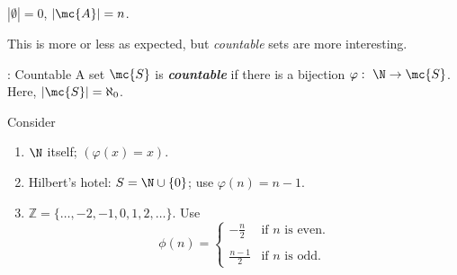 \begin{notation}
	\(|\emptyset|=0\), \(|\mc{A}|=n\).
\end{notation}

This is more or less as expected, but \emph{countable} sets are more interesting.
\begin{ndef}{: Countable}
	A set \(\mc{S}\) is \emph{\textbf{countable}} if there is a bijection \(\varphi:~\N\to \mc{S}\). Here, \(|\mc{S}|=\aleph_0\).
	\begin{example}
		Consider
		\begin{enumerate}
			\item \(\N\) itself; \((\varphi(x)=x)\).
			
			\item Hilbert's hotel: \(S=\N\cup\{0\}\); use \(\varphi(n)=n-1\).
			
			\item \(\mathbb{Z}=\{\dots,-2,-1,0,1,2,\dots\}\). \newline
			Use 
			\begin{equation*}
				\phi(n)=\begin{cases}
					\displaystyle-\frac{n}{2}&\text{if \(n\) is even}.\\\\
					\displaystyle\frac{n-1}{2}&\text{if \(n\) is odd}.
				\end{cases}
			\end{equation*} 
		\end{enumerate}
	\end{example}
\end{ndef}

